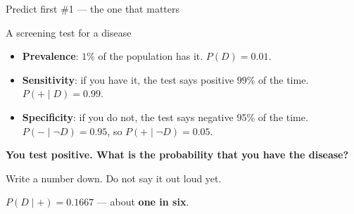\documentclass[aspectratio=169]{beamer}
\begin{document}
\begin{frame}[shrink=6]{Predict first \#1 --- the one that matters}
  \begin{block}{A screening test for a disease}
    \begin{itemize}
      \item \textbf{Prevalence}: $1\%$ of the population has it. $P(D) = 0.01$.
      \item \textbf{Sensitivity}: if you have it, the test says positive
        $99\%$ of the time. $P(+ \mid D) = 0.99$.
      \item \textbf{Specificity}: if you do not, the test says negative
        $95\%$ of the time. $P(- \mid \lnot D) = 0.95$, so
        $P(+ \mid \lnot D) = 0.05$.
    \end{itemize}
  \end{block}
  \vspace{0.3em}
  \begin{center}\large
    \textbf{You test positive. What is the probability that you have the
    disease?}
  \end{center}
  \vspace{0.3em}
  \begin{center}\small
    Write a number down. Do not say it out loud yet.
  \end{center}
  \begin{alertblock}{}
    \centering
    \Large $P(D \mid +) = \mathbf{0.1667}$ --- about \textbf{one in six}.
  \end{alertblock}
\end{frame}
\end{document}
